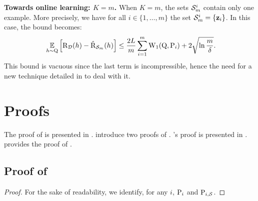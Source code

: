 \begin{noaddcontents}
    \textbf{Towards online learning: $K=m$.} When $K=m$, the sets $\Sm^{i}$ contain only one example. 
    More precisely, we have for all $i\in\{1,\dots,m\}$ the set $\Sm^{i}=\{\z_i\}$.
    In this case, the bound becomes:
    \begin{align*}
    \ \EE_{h\sim\Q}\Big[ \Risk_{\D}(h) - \Riskhat_{\Sm}(h) \Big] \le \frac{2L}{m}\sum_{i=1}^{m}\W_{1}(\Q, \P_i) + 2\sqrt{\ln\frac{m}{\delta}}.
    \end{align*}
    This bound is vacuous since the last term is incompressible, hence the need for a new technique detailed in  to deal with it.
    
    \section{Proofs}
    \label{sec:proofs}
    
    The proof of  is presented in . 
     introduce two proofs of .
    's proof is presented in .
     provides the proof of .
    
    \subsection{Proof of }
    \label{sec:proof-supervised-ht}
    
    \theoremsupervisedht*
    \begin{proof}
    For the sake of readability, we identify, for any $i$, $\P_i $ and $\P_{i,\S}$.

\end{proof}
\end{noaddcontents}
